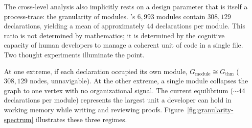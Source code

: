 The cross-level analysis also implicitly rests on a design parameter that is itself a process-trace: the granularity of modules. 's $6{,}993$ modules contain $308{,}129$ declarations, yielding a mean of approximately $44$ declarations per module. This ratio is not determined by mathematics; it is determined by the cognitive capacity of human developers to manage a coherent unit of code in a single file. Two thought experiments illuminate the point.

At one extreme, if each declaration occupied its own module, $G_{\mathrm{module}} \cong G_{\mathrm{thm}}$ ($308{,}129$ nodes, unnavigable). At the other extreme, a single module collapses the graph to one vertex with no organizational signal. The current equilibrium (${\sim}44$ declarations per module) represents the largest unit a developer can hold in working memory while writing and reviewing proofs. Figure~\ref{fig:granularity-spectrum} illustrates these three regimes.

